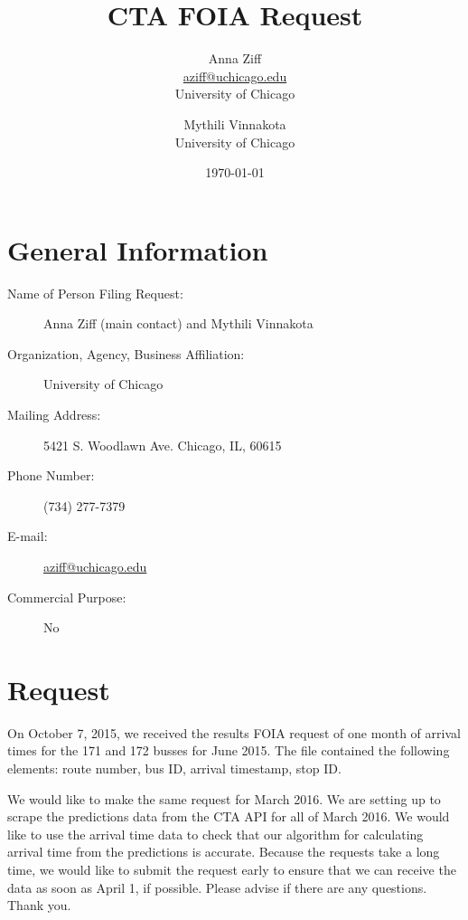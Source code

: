 \documentclass{article}
\begin{document}
\title{CTA FOIA Request}
\author{Anna Ziff \\ \url{aziff@uchicago.edu} \\ University of Chicago \and Mythili Vinnakota  \\ University of Chicago}
\date{\today}
\maketitle

\section*{General Information}

\begin{description}
	\item[Name of Person Filing Request:] Anna Ziff (main contact) and Mythili Vinnakota
	\item[Organization, Agency, Business Affiliation:] University of Chicago
	\item[Mailing Address:] 5421 S. Woodlawn Ave. Chicago, IL, 60615
	\item[Phone Number:] (734) 277-7379
	\item[E-mail:] \url{aziff@uchicago.edu}
	\item[Commercial Purpose:] No
\end{description}


\section*{Request}
On October 7, 2015, we received the results FOIA request of one month of arrival times for the 171 and 172 busses for June 2015. The file contained the following elements: route number, bus ID, arrival timestamp, stop ID.

We would like to make the same request for March 2016. We are setting up to scrape the predictions data from the CTA API for all of March 2016. We would like to use the arrival time data to check that our algorithm for calculating arrival time from the predictions is accurate. Because the requests take a long time, we would like to submit the request early to ensure that we can receive the data as soon as April 1, if possible. Please advise if there are any questions. Thank you.
\end{document}
